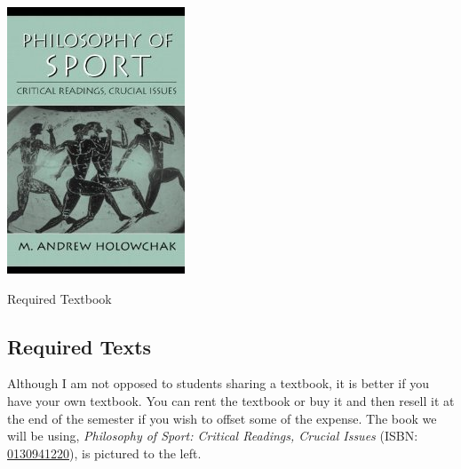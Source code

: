 \documentclass{tufte-handout}
\begin{document}
\begin{marginfigure}%
  \includegraphics[width=\linewidth]{../assets/phil-of-sport.jpg}
  \caption{Required Textbook}
  \label{fig:marginfig}
\end{marginfigure}

\subsection{Required Texts}
Although I am not opposed to students sharing a textbook, it is better if you have your own textbook. You can rent the textbook or buy it and then resell it at the end of the semester if you wish to offset some of the expense. The book we will be using, \textit{Philosophy of Sport: Critical Readings, Crucial Issues} (ISBN: \href{http://www.amazon.com/Philosophy-Sport-Critical-Readings-Crucial/dp/0130941220}{\color{darkblue}0130941220}), is pictured to the left.
\end{document}
